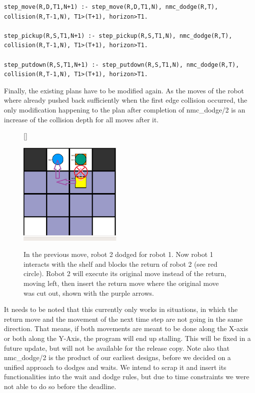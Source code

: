 \documentclass{llncs}
\begin{document}
\begin{lstlisting}[basicstyle=\fontsize{9}{11}\selectfont\ttfamily,frame=single,breaklines=true]
step_move(R,D,T1,N+1) :- step_move(R,D,T1,N), nmc_dodge(R,T), collision(R,T-1,N), T1>(T+1), horizon>T1.

step_pickup(R,S,T1,N+1) :- step_pickup(R,S,T1,N), nmc_dodge(R,T),  collision(R,T-1,N), T1>(T+1), horizon>T1.

step_putdown(R,S,T1,N+1) :- step_putdown(R,S,T1,N), nmc_dodge(R,T), collision(R,T-1,N), T1>(T+1), horizon>T1.
\end{lstlisting}
Finally, the existing plans have to be modified again. As the moves of the robot where already pushed back sufficiently when the first edge collision occurred, the only modification happening to the plan after completion of nmc\_dodge/2 is an increase of the collision depth for all moves after it. \newline
\begin{figure}
[\FBwidth]
{\caption{In the previous move, robot 2 dodged for robot 1. Now robot 1 interacts with the shelf and blocks the return of robot 2 (see red circle). Robot 2 will execute its original move instead of the return, moving left, then insert the return move where the original move was cut out, shown with the purple arrows.}\label{fig:test}}
{\includegraphics[width=\textwidth, height= 5cm, keepaspectratio]{nmc}}
\end{figure}
\newline
It needs to be noted that this currently only works in situations, in which the return move and the movement of the next time step are not going in the same direction. That means, if both movements are meant to be done along the X-axis or both along the Y-Axis, the program will end up stalling. This will be fixed in a future update, but will not be available for the release copy.\newline
Note also that nmc\_dodge/2 is the product of our earliest designs, before we decided on a unified approach to dodges and waits. We intend to scrap it and insert its functionalities into the wait and dodge rules, but due to time constraints we were not able to do so before the deadline.
\end{document}
